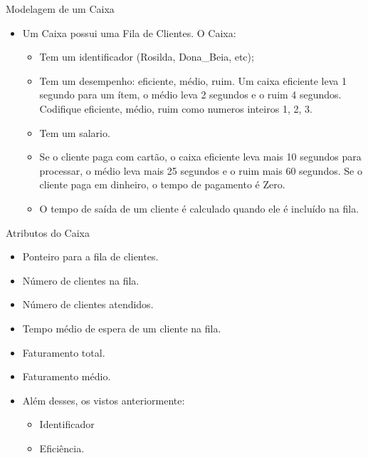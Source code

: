 \documentclass[12pt,table,xcolor={dvipsnames}]{beamer}
\begin{document}
\begin{frame}[fragile]{Modelagem de um Caixa}
\begin{itemize}
\item Um Caixa possui uma Fila de Clientes. O Caixa:
\begin{itemize}
\item Tem um identificador (Rosilda, Dona\_Beia, etc); 
\item Tem um desempenho: eficiente, médio, ruim. Um caixa eficiente leva 1 segundo para um ítem, o médio leva 2 segundos e o ruim 4 segundos. Codifique eficiente, médio, ruim como numeros inteiros 1, 2, 3.
\item Tem um salario.
\item Se o cliente paga com cartão, o caixa eficiente leva mais 10 segundos para processar, o médio leva mais 25 segundos e o ruim mais 60 segundos. Se o cliente paga em dinheiro, o tempo de pagamento é Zero.
\item O tempo de saída de um cliente é calculado quando ele é incluído na fila.
\end{itemize}
\end{itemize}
\end{frame}

\begin{frame}[fragile]{Atributos do Caixa}
\begin{itemize}
\item Ponteiro para a fila de clientes.
\item Número de clientes na fila.
\item Número de clientes atendidos.
\item Tempo médio de espera de um cliente na fila.
\item Faturamento total.
\item Faturamento médio.
\item Além desses, os vistos anteriormente:
\begin{itemize}
\item Identificador
\item Eficiência.
\end{itemize}
\end{itemize}
\end{frame}
\end{document}
